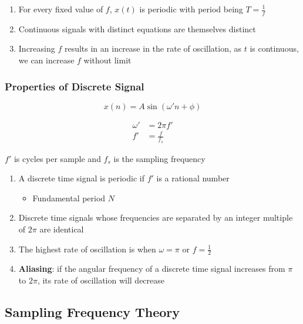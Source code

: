       \begin{enumerate}
        \item For every fixed value of $ f $, $ x\left( t \right) $ is periodic
        with period being $ T = \frac{1}{f} $
        \item Continuous signals with distinct equations are themselves distinct
        \item Increasing $ f $ results in an increase in the rate of oscillation,
        as $ t $ is continuous, we can increase $ f $ without limit
      \end{enumerate}

    \subsubsection{Properties of Discrete Signal}

      \begin{equation*}
        x\left( n \right) = A \sin\left( \omega' n + \phi \right)
      \end{equation*}

      \begin{align}
        \omega' &= 2\pi f' \\
        f' &= \frac{f}{f_{s}}
      \end{align}

      $ f' $ is cycles per sample and $ f_{s} $ is the sampling frequency

      \begin{enumerate}
        \item A discrete time signal is periodic if $ f' $ is a rational number
        \begin{itemize}
          \item Fundamental period $ N $
        \end{itemize}

        \item Discrete time signals whose frequencies are separated by an
        integer multiple of $ 2 \pi $ are identical
        \item The highest rate of oscillation is when $ \omega = \pi $ or
        $ f = \frac{1}{2} $
        \item \textbf{Aliasing}: if the angular frequency of a discrete time
        signal increases from $ \pi $ to $ 2\pi $, its rate of oscillation
        will decrease
      \end{enumerate}

  \subsection{Sampling Frequency Theory}

